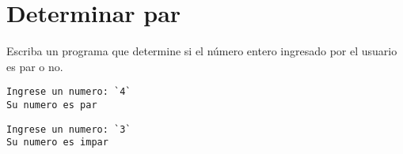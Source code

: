 \section{Determinar par}

Escriba un programa que determine si el número entero ingresado por el
usuario es par o no.

\begin{lstlisting}[language=testcase]
Ingrese un numero: `4`
Su numero es par
\end{lstlisting}

\begin{lstlisting}[language=testcase]
Ingrese un numero: `3`
Su numero es impar
\end{lstlisting}

